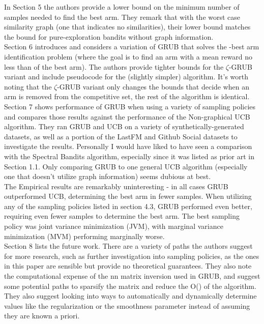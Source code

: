 \documentclass{article}[12pt]
\begin{document}
In Section 5 the authors provide a lower bound on the minimum number of samples needed to find the best arm.
They remark that with the worst case similarity graph (one that indicates no similarities),
their lower bound matches the bound for pure-exploration bandits without graph information. \\

Section 6 introduces and considers a variation of GRUB that solves the -best arm identification problem (where the goal is to find an arm with a mean reward no less than of the best arm).
The authors provide tighter bounds for the $\zeta$-GRUB variant and include pseudocode for the (slightly simpler) algorithm.
It’s worth noting that the $\zeta$-GRUB variant only changes the bounds that decide when an arm is removed from the competitive set, the rest of the algorithm is identical. \\

Section 7 shows performance of GRUB when using a variety of sampling policies and compares those results against the performance of the Non-graphical UCB algorithm.
They ran GRUB and UCB on a variety of synthetically-generated datasets, as well as a portion of the LastFM and Github Social datasets to investigate the results.
Personally I would have liked to have seen a comparison with the Spectral Bandits algorithm, especially since it was listed as prior art in Section 1.1.
Only comparing GRUB to one general UCB algorithm (especially one that doesn’t utilize graph information) seems dubious at best. \\

The Empirical results are remarkably uninteresting - in all cases GRUB outperformed UCB, determining the best arm in fewer samples.
When utilizing any of the sampling policies listed in section 4.3, GRUB performed even better, requiring even fewer samples to determine the best arm.
The best sampling policy was joint variance minimization (JVM), with marginal variance minimization (MVM) performing marginally worse. \\

Section 8 lists the future work.
There are a variety of paths the authors suggest for more research,
such as further investigation into sampling policies,
as the ones in this paper are sensible but provide no theoretical guarantees.
They also note the computational expense of the nn matrix inversion used in GRUB,
and suggest some potential paths to sparsify the matrix and reduce the O() of the algorithm.
They also suggest looking into ways to automatically and dynamically determine values like the regularization or the smoothness parameter instead of assuming they are known a priori. \\
\end{document}
